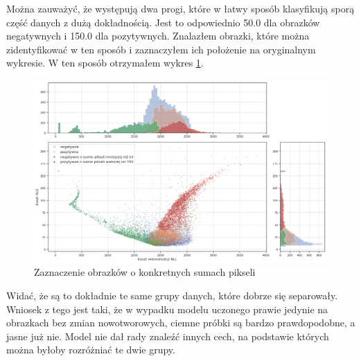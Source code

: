 Można zauważyć, że występują dwa progi, które w łatwy sposób klasyfikują sporą część danych z dużą dokładnością. Jest to odpowiednio 50.0 dla obrazków negatywnych i 150.0 dla pozytywnych. Znalazłem obrazki, które można zidentyfikować w ten sposób i zaznaczyłem ich położenie na oryginalnym wykresie. W ten sposób otrzymałem wykres \ref{fig:soft_vae_th}.

\begin{figure}[h!]
    \centering
    \includegraphics[width=1.0\textwidth]{images/soft_vae_th_v3}
    \caption{Zaznaczenie obrazków o konkretnych sumach pikseli}
    \label{fig:soft_vae_th}
\end{figure}

Widać, że są to dokładnie te same grupy danych, które dobrze się separowały. Wniosek z tego jest taki, że w wypadku modelu uczonego prawie jedynie na obrazkach bez zmian nowotworowych, ciemne próbki są bardzo prawdopodobne, a jasne już nie. Model nie dał rady znaleźć innych cech, na podstawie których można byłoby rozróżniać te dwie grupy.





